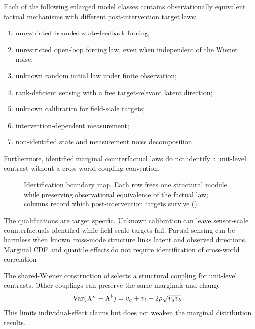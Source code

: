 \begin{theorem}\label{thm:nonid-assembly}
Each of the following enlarged model classes contains observationally equivalent factual mechanisms with different post-intervention target laws:
\begin{enumerate}[label=(\roman*)]
\item unrestricted bounded state-feedback forcing;
\item unrestricted open-loop forcing law, even when independent of the Wiener noise;
\item unknown random initial law under finite observation;
\item rank-deficient sensing with a free target-relevant latent direction;
\item unknown calibration for field-scale targets;
\item intervention-dependent measurement;
\item non-identified state and measurement noise decomposition.
\end{enumerate}
Furthermore, identified marginal counterfactual laws do not identify a unit-level contrast without a cross-world coupling convention.
\end{theorem}

\begin{figure}[t]
\centering
\resizebox{.98\textwidth}{!}{}
\caption{Identification boundary map. Each row frees one structural module while preserving observational equivalence of the factual law; columns record which post-intervention targets survive ().}
\label{fig:boundary}
\end{figure}

The qualifications are target specific. Unknown calibration can leave sensor-scale counterfactuals identified while field-scale targets fail. Partial sensing can be harmless when known cross-mode structure links latent and observed directions. Marginal CDF and quantile effects do not require identification of cross-world correlation.

The shared-Wiener construction of  selects a structural coupling for unit-level contrasts. Other couplings can preserve the same marginals and change
\[
 \operatorname{Var}(X^a-X^b)=v_a+v_b-2\rho\sqrt{v_av_b}.
\]
This limits individual-effect claims but does not weaken the marginal distribution results.
